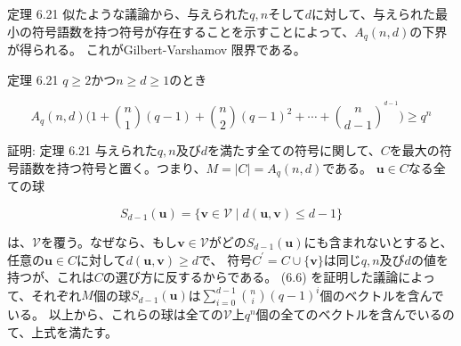 \documentclass[dvipdfmx,10pt,jsarticle]{beamer}
\begin{document}
  \begin{frame}{定理 6.21} 似たような議論から、与えられた$q, n$そして$d$に対して、与えられた最小の符号語数を持つ符号が存在することを示すことによって、$A_q(n, d)$の下界が得られる。
    これがGilbert-Varshamov 限界である。

    \begin{block}{定理 6.21}
      $q \geq 2$かつ$n \geq d \geq 1$のとき

      \[A_q (n, d) \big( 1 + \binom n1 (q - 1) + \binom n2 {(q- 1)}^2 + \cdots + \binom{n}{d - 1}^{^{d -1} } \big) \geq q^n \]
    \end{block}
  \end{frame}


  \begin{frame}{証明: 定理 6.21}
      与えられた$q, n$及び$d$を満たす全ての符号に関して、$C$を最大の符号語数を持つ符号と置く。つまり、$M = \mid C \mid = A_q (n, d)$である。
      $\mathbf{u} \in C$なる全ての球

      \[ S_{d - 1} (\mathbf{u}) = \lbrace \mathbf{v} \in \mathcal{V} \mid d(\mathbf{u}, \mathbf{v}) \leq d - 1 \rbrace \]

      は、$\mathcal{V}$を覆う。なぜなら、もし$\mathbf{v} \in \mathcal{V}$がどの$S_{d - 1} (\mathbf{u})$にも含まれないとすると、任意の$\mathbf{u} \in C$に対して$d (\mathbf{u}, \mathbf{v}) \geq d$で、
      符号$C^\prime = C \cup \lbrace \mathbf{v} \rbrace$は同じ$q, n$及び$d$の値を持つが、これは$C$の選び方に反するからである。
      (6.6) を証明した議論によって、それぞれ$M$個の球$S_{d-1}(\mathbf{u})$は$\sum_{i=0}^{d-1}\binom ni {(q - 1)}^i$個のベクトルを含んでいる。
      以上から、これらの球は全ての$\mathcal{V}$上$q^n$個の全てのベクトルを含んでいるのて、上式を満たす。

  \end{frame}
\end{document}

